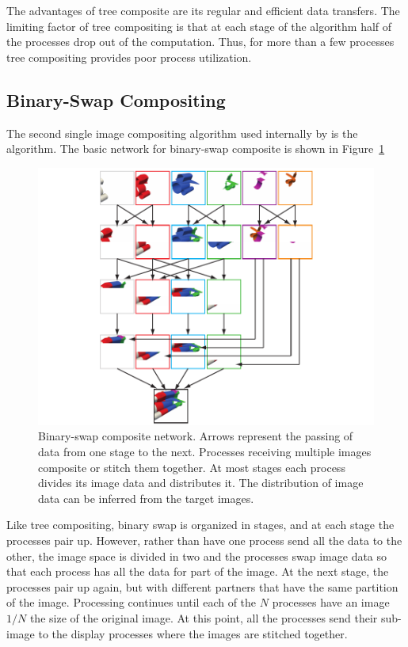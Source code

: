 The advantages of tree composite are its regular and efficient data
transfers.  The limiting factor of tree compositing is that at each stage
of the algorithm half of the processes drop out of the computation.  Thus,
for more than a few processes tree compositing provides poor process
utilization.


\subsection{Binary-Swap Compositing}


The second single image compositing algorithm used internally by \IceT is
the  algorithm.  The basic network for binary-swap
composite is shown in Figure~\ref{fig:BinarySwap}

\begin{figure}
  \centering
  \includegraphics{images/BinarySwap}
  \caption[Binary-swap composite network.]{Binary-swap composite network.
    Arrows represent the passing of data from one stage to the next.
    Processes receiving multiple images composite or stitch them together.
    At most stages each process divides its image data and distributes it.
    The distribution of image data can be inferred from the target images.}
  \label{fig:BinarySwap}
\end{figure}

Like tree compositing, binary swap is organized in stages, and at each
stage the processes pair up.  However, rather than have one process send
all the data to the other, the image space is divided in two and the
processes swap image data so that each process has all the data for part of
the image.  At the next stage, the processes pair up again, but with
different partners that have the same partition of the image.  Processing
continues until each of the $N$ processes have an image $1/N$ the size of
the original image.  At this point, all the processes send their sub-image
to the display processes where the images are stitched together.

